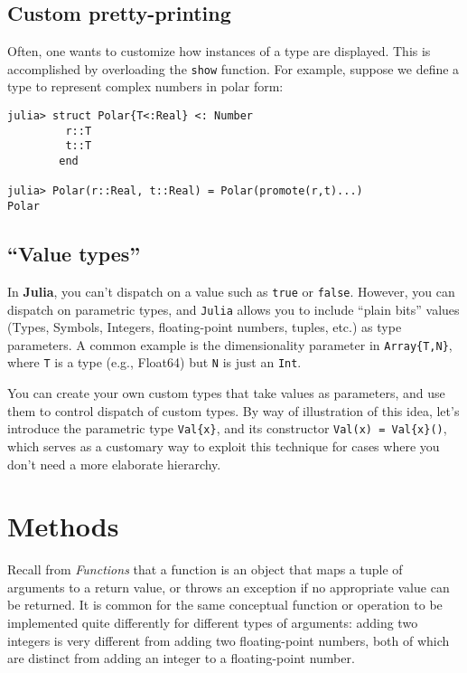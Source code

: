 \documentclass[
]{article}
\begin{document}
\hypertarget{custom-pretty-printing}{%
\subsection{Custom pretty-printing}\label{custom-pretty-printing}}

Often, one wants to customize how instances of a type are displayed.
This is accomplished by overloading the \texttt{show} function. For
example, suppose we define a type to represent complex numbers in polar
form:

\begin{verbatim}
julia> struct Polar{T<:Real} <: Number
         r::T
         t::T
        end

julia> Polar(r::Real, t::Real) = Polar(promote(r,t)...)
Polar
\end{verbatim}

\hypertarget{value-types}{%
\subsection{``Value types''}\label{value-types}}

In \textbf{Julia}, you can't dispatch on a value such as \texttt{true}
or \texttt{false}. However, you can dispatch on parametric types, and
\texttt{Julia} allows you to include ``plain bits'' values (Types,
Symbols, Integers, floating-point numbers, tuples, etc.) as type
parameters. A common example is the dimensionality parameter in
\texttt{Array\{T,N\}}, where \texttt{T} is a type (e.g., Float64) but
\texttt{N} is just an \texttt{Int}.

You can create your own custom types that take values as parameters, and
use them to control dispatch of custom types. By way of illustration of
this idea, let's introduce the parametric type \texttt{Val\{x\}}, and
its constructor \texttt{Val(x)\ =\ Val\{x\}()}, which serves as a
customary way to exploit this technique for cases where you don't need a
more elaborate hierarchy.

\newpage

\hypertarget{methods}{%
\section{Methods}\label{methods}}

Recall from \emph{Functions} that a function is an object that maps a
tuple of arguments to a return value, or throws an exception if no
appropriate value can be returned. It is common for the same conceptual
function or operation to be implemented quite differently for different
types of arguments: adding two integers is very different from adding
two floating-point numbers, both of which are distinct from adding an
integer to a floating-point number.
\end{document}
